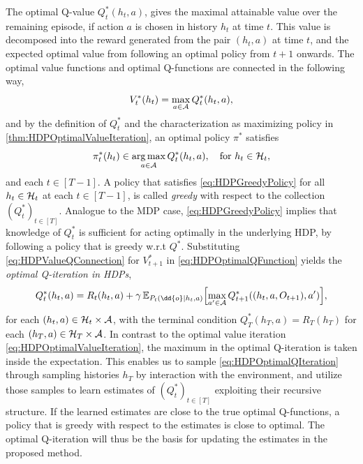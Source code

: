 \documentclass[
    a4paper,
    11pt,
    bibliography=totoc,
    listof=totoc,      
    headinclude=true,
    cleardoublepage=empty,
]{scrbook}
\theoremstyle{plain}
\theoremstyle{definition}
\theoremstyle{remark}
\newcommand{\E}{\mathbb E}
\newcommand{\SpaceA}{{\cal A}}
\newcommand{\SpaceH}{{\cal H}}
\DeclareMathOperator*{\argmax}{arg\,max}
\begin{document}
The optimal Q-value $Q^*_t(h_t,a)$, gives the maximal attainable value over
the remaining episode, if action $a$ is chosen in history $h_t$ at time $t$.
This value is decomposed into the reward generated from the pair $(h_t,a)$ at
time $t$, and the expected optimal value from following an optimal policy from 
$t+1$ onwards. The optimal value functions and optimal Q-functions are 
connected in the following way,
\begin{equation} 
\label{eq:HDPValueQConnection}
    V^*_t(h_t) = \max_{a\in\SpaceA} Q^*_t(h_t, a),
\end{equation}
and by the definition of $Q^*_t$ and the characterization as maximizing policy 
in \cref{thm:HDPOptimalValueIteration}, an optimal policy $\pi^*$ satisfies
\begin{equation}
\label{eq:HDPGreedyPolicy}
    \pi^*_t(h_t) \in \argmax_{a\in\SpaceA} Q^*_t(h_t,a),
    \quad \text{for } h_t\in\SpaceH_t,
\end{equation}
and each $t\in[T-1]$. A policy that satisfies \eqref{eq:HDPGreedyPolicy} for 
all $h_t\in\SpaceH_t$ at each $t\in[T-1]$, is called \textit{greedy} with 
respect to the collection $(Q^*_t)_{t\in[T]}$. Analogue to the MDP case, 
\eqref{eq:HDPGreedyPolicy} implies that knowledge of $Q^*_t$ is sufficient for 
acting optimally in the underlying HDP, by following a policy that is greedy 
w.r.t $Q^*$. Substituting \eqref{eq:HDPValueQConnection} for $V^*_{t+1}$ in 
\cref{eq:HDPOptimalQFunction} yields the \textit{optimal Q-iteration in
HDPs},
\begin{equation}
\label{eq:HDPOptimalQIteration}
    Q^*_t(h_t,a) 
    = R_t(h_t,a) + \gamma \, \E_{P_t(\dd{o}|h_t,a)}\Bigl[
        \max_{a'\in\SpaceA} Q^*_{t+1}((h_t, a, O_{t+1}), a')
    \Bigr],
\end{equation}
for each $(h_t,a)\in\SpaceH_t\times\SpaceA$, with the terminal condition
$Q^*_T(h_T,a) = R_T(h_T)$ for each $(h_T,a) \in\SpaceH_T \times \SpaceA$.
In contrast to the optimal value iteration
\eqref{eq:HDPOptimalValueIteration}, the maximum in the optimal Q-iteration is 
taken inside the expectation. This enables us to sample 
\cref{eq:HDPOptimalQIteration} through sampling histories $h_T$ by interaction 
with the environment, and utilize those samples to learn estimates of 
$(Q^*_t)_{t\in[T]}$ exploiting their recursive structure. If the learned 
estimates are close to the true optimal Q-functions, a policy that is greedy 
with respect to the estimates is close to optimal. The optimal Q-iteration 
will thus be the basis for updating the estimates in the proposed method.
\end{document}
